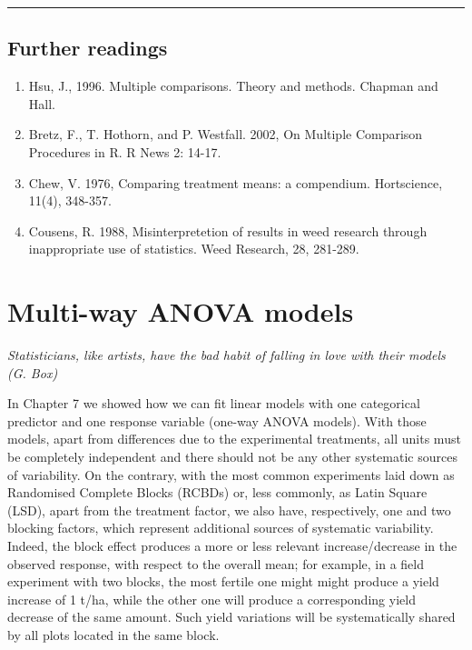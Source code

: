 \documentclass[a4paper,12pt,oneside]{book}
\providecommand{\tightlist}{%
  \setlength{\itemsep}{0pt}\setlength{\parskip}{0pt}}
\begin{document}
\begin{center}\rule{0.5\linewidth}{0.5pt}\end{center}

\hypertarget{further-readings-7}{%
\section{Further readings}\label{further-readings-7}}

\begin{enumerate}
\def\labelenumi{\arabic{enumi}.}
\tightlist
\item
  Hsu, J., 1996. Multiple comparisons. Theory and methods. Chapman and Hall.
\item
  Bretz, F., T. Hothorn, and P. Westfall. 2002, On Multiple Comparison Procedures in R. R News 2: 14-17.
\item
  Chew, V. 1976, Comparing treatment means: a compendium. Hortscience, 11(4), 348-357.
\item
  Cousens, R. 1988, Misinterpretetion of results in weed research through inappropriate use of statistics. Weed Research, 28, 281-289.
\end{enumerate}

\hypertarget{multi-way-anova-models}{%
\chapter{Multi-way ANOVA models}\label{multi-way-anova-models}}

\emph{Statisticians, like artists, have the bad habit of falling in love with their models (G. Box)}

In Chapter 7 we showed how we can fit linear models with one categorical predictor and one response variable (one-way ANOVA models). With those models, apart from differences due to the experimental treatments, all units must be completely independent and there should not be any other systematic sources of variability. On the contrary, with the most common experiments laid down as Randomised Complete Blocks (RCBDs) or, less commonly, as Latin Square (LSD), apart from the treatment factor, we also have, respectively, one and two blocking factors, which represent additional sources of systematic variability. Indeed, the block effect produces a more or less relevant increase/decrease in the observed response, with respect to the overall mean; for example, in a field experiment with two blocks, the most fertile one might might produce a yield increase of 1 t/ha, while the other one will produce a corresponding yield decrease of the same amount. Such yield variations will be systematically shared by all plots located in the same block.
\end{document}
